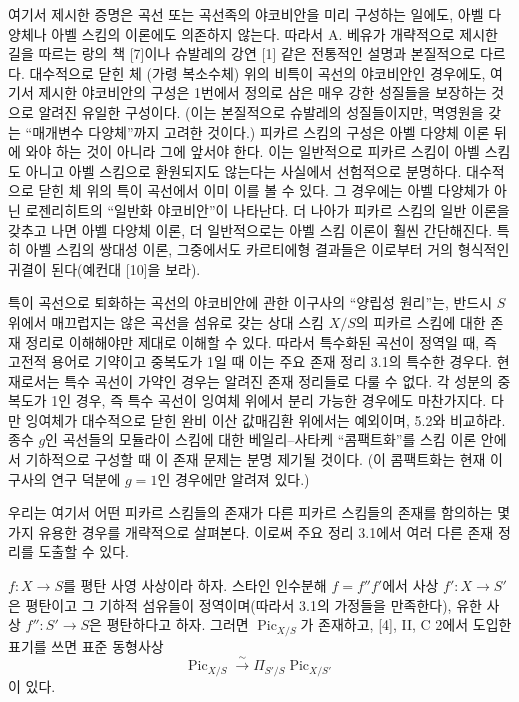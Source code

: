  여기서 제시한 증명은 곡선 또는 곡선족의 야코비안을
미리 구성하는 일에도, 아벨 다양체나 아벨 스킴의 이론에도 의존하지 않는다.
따라서 A. 베유가 개략적으로 제시한 길을 따르는 랑의 책 [7]이나 슈발레의
강연 [1] 같은 전통적인 설명과 본질적으로 다르다. 대수적으로 닫힌 체
(가령 복소수체) 위의 비특이 곡선의 야코비안인 경우에도, 여기서 제시한
야코비안의 구성은 1번에서 정의로 삼은 매우 강한 성질들을 보장하는 것으로
알려진 유일한 구성이다. (이는 본질적으로 슈발레의 성질들이지만, 멱영원을
갖는 ``매개변수 다양체''까지 고려한 것이다.) 피카르 스킴의 구성은 아벨
다양체 이론 뒤에 와야 하는 것이 아니라 그에 앞서야 한다. 이는 일반적으로
피카르 스킴이 아벨 스킴도 아니고 아벨 스킴으로 환원되지도 않는다는
사실에서 선험적으로 분명하다. 대수적으로 닫힌 체 위의 특이 곡선에서 이미
이를 볼 수 있다. 그 경우에는 아벨 다양체가 아닌 로젠리히트의 ``일반화
야코비안''이 나타난다. 더 나아가 피카르 스킴의 일반 이론을 갖추고 나면
아벨 다양체 이론, 더 일반적으로는 아벨 스킴 이론이 훨씬 간단해진다.
특히 아벨 스킴의 쌍대성 이론, 그중에서도 카르티에형 결과들은 이로부터
거의 형식적인 귀결이 된다(예컨대 [10]을 보라).

 특이 곡선으로 퇴화하는 곡선의 야코비안에 관한
이구사의 ``양립성 원리''는, 반드시 $S$ 위에서 매끄럽지는 않은 곡선을
섬유로 갖는 상대 스킴 $X/S$의 피카르 스킴에 대한 존재 정리로 이해해야만
제대로 이해할 수 있다. 따라서 특수화된 곡선이 정역일 때, 즉 고전적
용어로 기약이고 중복도가 1일 때 이는 주요 존재 정리 3.1의 특수한 경우다.
현재로서는 특수 곡선이 가약인 경우는 알려진 존재 정리들로 다룰 수 없다.
각 성분의 중복도가 1인 경우, 즉 특수 곡선이 잉여체 위에서 분리 가능한
경우에도 마찬가지다. 다만 잉여체가 대수적으로 닫힌 완비 이산 값매김환
위에서는 예외이며, 5.2와 비교하라. 종수 $g$인 곡선들의 모듈라이 스킴에
대한 베일리--사타케 ``콤팩트화''를 스킴 이론 안에서 기하적으로 구성할
때 이 존재 문제는 분명 제기될 것이다. (이 콤팩트화는 현재 이구사의
연구 덕분에 $g=1$인 경우에만 알려져 있다.)


우리는 여기서 어떤 피카르 스킴들의 존재가 다른 피카르 스킴들의 존재를
함의하는 몇 가지 유용한 경우를 개략적으로 살펴본다. 이로써 주요 정리
3.1에서 여러 다른 존재 정리를 도출할 수 있다.

 $f:X\longrightarrow S$를 평탄 사영 사상이라 하자. 스타인
인수분해 $f=f''f'$에서 사상 $f':X\longrightarrow S'$은 평탄이고 그 기하적
섬유들이 정역이며(따라서 3.1의 가정들을 만족한다), 유한 사상
$f'':S'\longrightarrow S$은 평탄하다고 하자. 그러면
$\operatorname{Pic}_{X/S}$가 존재하고, [4], II, C 2에서 도입한 표기를 쓰면
표준 동형사상
\[
\operatorname{Pic}_{X/S}\xrightarrow{\sim}
\Pi_{S'/S}\operatorname{Pic}_{X/S'}
\]
이 있다.

